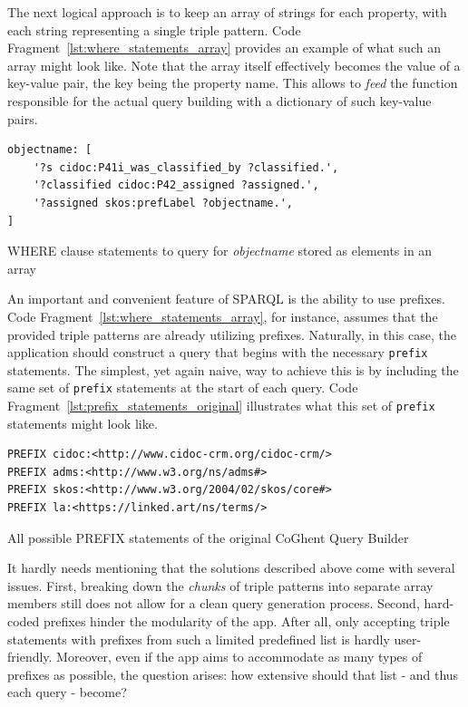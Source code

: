 The next logical approach is to keep an array of strings for each property, with each string representing a single triple pattern. Code Fragment~\ref{lst:where_statements_array} provides an example of what such an array might look like. Note that the array itself effectively becomes the value of a key-value pair, the key being the property name. This allows to \textit{feed} the function responsible for the actual query building with a dictionary of such key-value pairs.

\begin{listing}[htbp]
    \begin{verbatim}
objectname: [
    '?s cidoc:P41i_was_classified_by ?classified.',
    '?classified cidoc:P42_assigned ?assigned.',
    '?assigned skos:prefLabel ?objectname.',
]
    \end{verbatim}
    \caption{WHERE clause statements to query for \textit{objectname} stored as elements in an array}
    \label{lst:where_statements_array}
\end{listing}

An important and convenient feature of SPARQL is the ability to use prefixes. Code Fragment~\ref{lst:where_statements_array}, for instance, assumes that the provided triple patterns are already utilizing prefixes. Naturally, in this case, the application should construct a query that begins with the necessary \texttt{prefix} statements. The simplest, yet again naive, way to achieve this is by including the same set of \texttt{prefix} statements at the start of each query. Code Fragment~\ref{lst:prefix_statements_original} illustrates what this set of \texttt{prefix} statements might look like.

\begin{listing}[htbp]
    \begin{verbatim}
PREFIX cidoc:<http://www.cidoc-crm.org/cidoc-crm/>
PREFIX adms:<http://www.w3.org/ns/adms#>
PREFIX skos:<http://www.w3.org/2004/02/skos/core#>
PREFIX la:<https://linked.art/ns/terms/>
    \end{verbatim}
    \caption{All possible PREFIX statements of the original CoGhent Query Builder}
    \label{lst:prefix_statements_original}
\end{listing}

It hardly needs mentioning that the solutions described above come with several issues. First, breaking down the \textit{chunks} of triple patterns into separate array members still does not allow for a clean query generation process. Second, hard-coded prefixes hinder the modularity of the app. After all, only accepting triple statements with prefixes from such a limited predefined list is hardly user-friendly. Moreover, even if the app aims to accommodate as many types of prefixes as possible, the question arises: how extensive should that list - and thus each query - become?

